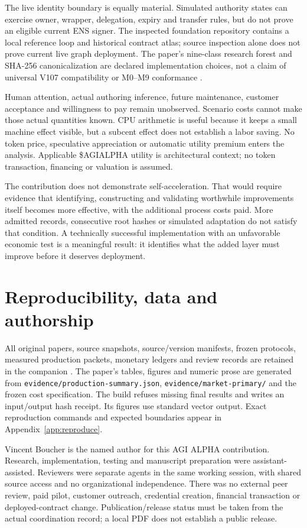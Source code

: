 \documentclass[11pt,a4paper]{article}
\newcommand{\artifact}[1]{\nolinkurl{#1}}
\begin{document}
The live identity boundary is equally material. Simulated authority states can exercise owner, wrapper, delegation, expiry and transfer rules, but do not prove an eligible current ENS signer. The inspected foundation repository contains a local reference loop and historical contract atlas; source inspection alone does not prove current live graph deployment. The paper's nine-class research forest and SHA-256 canonicalization are declared implementation choices, not a claim of universal V107 compatibility or M0--M9 conformance \citep[§§18--23, pp.~15--18]{merkle}.

Human attention, actual authoring inference, future maintenance, customer acceptance and willingness to pay remain unobserved. Scenario costs cannot make those actual quantities known. CPU arithmetic is useful because it keeps a small machine effect visible, but a subcent effect does not establish a labor saving. No token price, speculative appreciation or automatic utility premium enters the analysis. Applicable \$AGIALPHA utility is architectural context; no token transaction, financing or valuation is assumed.

The contribution does not demonstrate self-acceleration. That would require evidence that identifying, constructing and validating worthwhile improvements itself becomes more effective, with the additional process costs paid. More admitted records, consecutive root hashes or simulated adaptation do not satisfy that condition. A technically successful implementation with an unfavorable economic test is a meaningful result: it identifies what the added layer must improve before it deserves deployment.

\section*{Reproducibility, data and authorship}
All original papers, source snapshots, source/version manifests, frozen protocols, measured production packets, monetary ledgers and review records are retained in the companion \citep{companion}. The paper's tables, figures and numeric prose are generated from \artifact{evidence/production-summary.json}, \artifact{evidence/market-primary/} and the frozen cost specification. The build refuses missing final results and writes an input/output hash receipt. Its figures use standard vector output. Exact reproduction commands and expected boundaries appear in Appendix~\ref{app:reproduce}.

Vincent Boucher is the named author for this AGI ALPHA contribution. Research, implementation, testing and manuscript preparation were assistant-assisted. Reviewers were separate agents in the same working session, with shared source access and no organizational independence. There was no external peer review, paid pilot, customer outreach, credential creation, financial transaction or deployed-contract change. Publication/release status must be taken from the actual coordination record; a local PDF does not establish a public release.
\end{document}
